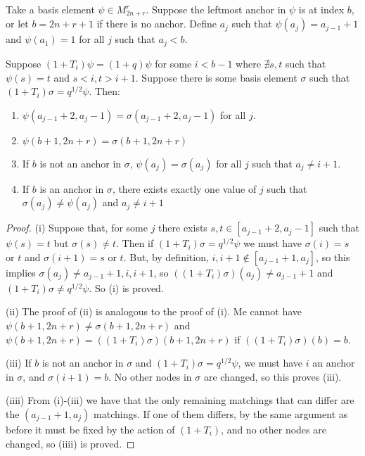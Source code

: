 \documentclass{amsart}
\begin{document}
 \vspace{5mm}
 \begin{lemma}
 	Take a basis element $\psi\in M_{2n+r}^r$. Suppose the leftmost anchor in $\psi$ is at index $b$, or let $b=2n+r+1$ if there is no anchor. Define $a_j$ such that $\psi(a_j)=a_{j-1}+1$ and $\psi(a_1)=1$ for all $j$ such that $a_j<b$. 
 	
 	Suppose $(1+T_i)\psi=(1+q)\psi$ for some $i<b-1$ where $\nexists s,t$ such that $\psi(s)=t$ and $s<i,t>i+1$. Suppose there is some basis element $\sigma$ such that $(1+T_i)\sigma=q^{1/2}\psi$. Then:
 	\\
 	
 	\begin{enumerate}[label={(\roman*)}]
 		\item  $\psi(a_{j-1}+2,a_j-1)=\sigma(a_{j-1}+2,a_j-1)$ for all $j$.
 		
 		\item $\psi(b+1,2n+r)=\sigma(b+1,2n+r)$
 		
 		\item If $b$ is not an anchor in $\sigma$, $\psi(a_j)=\sigma(a_j)$ for all $j$ such that $a_j\not=i+1$.
 		
 		\item If $b$ is an anchor in $\sigma$, there exists exactly one value of $j$ such that $\sigma(a_j)\not=\psi(a_j)$ and $a_j\not=i+1$
 	\end{enumerate}
 	\label{preimage under nothing}
 \end{lemma}
 
 \begin{proof}
 	
 	(i) Suppose that, for some $j$ there exists $s,t\in [a_{j-1}+2,a_j-1]$ such that $\psi(s)=t$ but $\sigma(s)\not=t$. Then if $(1+T_i)\sigma=q^{1/2}\psi$ we must have $\sigma(i)=s$ or $t$ and $\sigma(i+1)=s$ or $t$. But, by definition, $i,i+1\not\in[a_{j-1}+1,a_j]$, so this implies $\sigma(a_j)\not=a_{j-1}+1,i,i+1$, so $((1+T_i)\sigma)(a_j)\not=a_{j-1}+1$ and $(1+T_i)\sigma\not=q^{1/2}\psi$. So (i) is proved.
 	
 	\vspace{5mm}
 	(ii) The proof of (ii) is analogous to the proof of (i). Me cannot have $\psi(b+1,2n+r)\not=\sigma(b+1,2n+r)$ and $\psi(b+1,2n+r)=((1+T_i)\sigma)(b+1,2n+r)$ if $((1+T_i)\sigma)(b)=b$.
 	
 	\vspace{5mm}
 	(iii) If $b$ is not an anchor in $\sigma$ and $(1+T_i)\sigma=q^{1/2}\psi$, we must have $i$ an anchor in $\sigma$, and $\sigma(i+1)=b$. No other nodes in $\sigma$ are changed, so this proves (iii).
 	
 	\vspace{5mm}
 	(iiii) From (i)-(iii) we have that the only remaining matchings that can differ are the $(a_{j-1}+1,a_j)$ matchings. If one of them differs, by the same argument as before it must be fixed by the action of $(1+T_i)$, and no other nodes are changed, so (iiii) is proved.
 	
 \end{proof}
 
\end{document}
